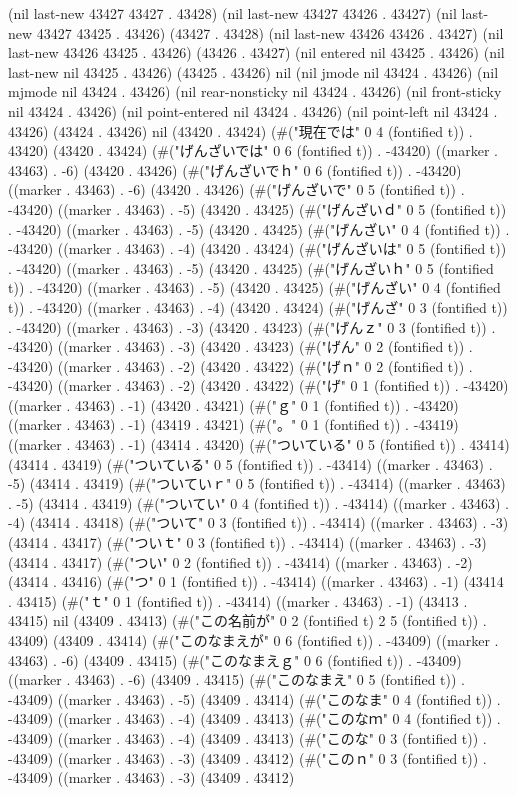 (nil last-new 43427 43427 . 43428) (nil last-new 43427 43426 . 43427) (nil last-new 43427 43425 . 43426) (43427 . 43428) (nil last-new 43426 43426 . 43427) (nil last-new 43426 43425 . 43426) (43426 . 43427) (nil entered nil 43425 . 43426) (nil last-new nil 43425 . 43426) (43425 . 43426) nil (nil jmode nil 43424 . 43426) (nil mjmode nil 43424 . 43426) (nil rear-nonsticky nil 43424 . 43426) (nil front-sticky nil 43424 . 43426) (nil point-entered nil 43424 . 43426) (nil point-left nil 43424 . 43426) (43424 . 43426) nil (43420 . 43424) (#("現在では" 0 4 (fontified t)) . 43420) (43420 . 43424) (#("げんざいでは" 0 6 (fontified t)) . -43420) ((marker . 43463) . -6) (43420 . 43426) (#("げんざいでｈ" 0 6 (fontified t)) . -43420) ((marker . 43463) . -6) (43420 . 43426) (#("げんざいで" 0 5 (fontified t)) . -43420) ((marker . 43463) . -5) (43420 . 43425) (#("げんざいｄ" 0 5 (fontified t)) . -43420) ((marker . 43463) . -5) (43420 . 43425) (#("げんざい" 0 4 (fontified t)) . -43420) ((marker . 43463) . -4) (43420 . 43424) (#("げんざいは" 0 5 (fontified t)) . -43420) ((marker . 43463) . -5) (43420 . 43425) (#("げんざいｈ" 0 5 (fontified t)) . -43420) ((marker . 43463) . -5) (43420 . 43425) (#("げんざい" 0 4 (fontified t)) . -43420) ((marker . 43463) . -4) (43420 . 43424) (#("げんざ" 0 3 (fontified t)) . -43420) ((marker . 43463) . -3) (43420 . 43423) (#("げんｚ" 0 3 (fontified t)) . -43420) ((marker . 43463) . -3) (43420 . 43423) (#("げん" 0 2 (fontified t)) . -43420) ((marker . 43463) . -2) (43420 . 43422) (#("げｎ" 0 2 (fontified t)) . -43420) ((marker . 43463) . -2) (43420 . 43422) (#("げ" 0 1 (fontified t)) . -43420) ((marker . 43463) . -1) (43420 . 43421) (#("ｇ" 0 1 (fontified t)) . -43420) ((marker . 43463) . -1) (43419 . 43421) (#("。" 0 1 (fontified t)) . -43419) ((marker . 43463) . -1) (43414 . 43420) (#("ついている" 0 5 (fontified t)) . 43414) (43414 . 43419) (#("ついている" 0 5 (fontified t)) . -43414) ((marker . 43463) . -5) (43414 . 43419) (#("ついていｒ" 0 5 (fontified t)) . -43414) ((marker . 43463) . -5) (43414 . 43419) (#("ついてい" 0 4 (fontified t)) . -43414) ((marker . 43463) . -4) (43414 . 43418) (#("ついて" 0 3 (fontified t)) . -43414) ((marker . 43463) . -3) (43414 . 43417) (#("ついｔ" 0 3 (fontified t)) . -43414) ((marker . 43463) . -3) (43414 . 43417) (#("つい" 0 2 (fontified t)) . -43414) ((marker . 43463) . -2) (43414 . 43416) (#("つ" 0 1 (fontified t)) . -43414) ((marker . 43463) . -1) (43414 . 43415) (#("ｔ" 0 1 (fontified t)) . -43414) ((marker . 43463) . -1) (43413 . 43415) nil (43409 . 43413) (#("この名前が" 0 2 (fontified t) 2 5 (fontified t)) . 43409) (43409 . 43414) (#("このなまえが" 0 6 (fontified t)) . -43409) ((marker . 43463) . -6) (43409 . 43415) (#("このなまえｇ" 0 6 (fontified t)) . -43409) ((marker . 43463) . -6) (43409 . 43415) (#("このなまえ" 0 5 (fontified t)) . -43409) ((marker . 43463) . -5) (43409 . 43414) (#("このなま" 0 4 (fontified t)) . -43409) ((marker . 43463) . -4) (43409 . 43413) (#("このなｍ" 0 4 (fontified t)) . -43409) ((marker . 43463) . -4) (43409 . 43413) (#("このな" 0 3 (fontified t)) . -43409) ((marker . 43463) . -3) (43409 . 43412) (#("このｎ" 0 3 (fontified t)) . -43409) ((marker . 43463) . -3) (43409 . 43412) 